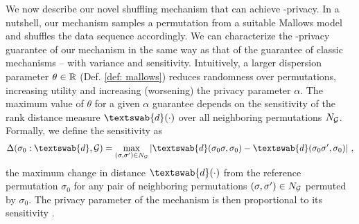 We now describe our novel shuffling mechanism that can achieve \name-privacy. In a nutshell, our mechanism samples a permutation from a suitable Mallows model and shuffles the data sequence accordingly. We can characterize the \name-privacy guarantee of our mechanism in the same way as that of the \DP guarantee of classic mechanisms \citep{Dwork} -- with variance and sensitivity. Intuitively, a larger dispersion parameter $\theta \in {\mathbb R}$ (Def. \ref{def: mallows}) reduces randomness over permutations, increasing utility and increasing (worsening) the privacy parameter $\alpha$. The maximum value of $\theta$ for a given $\alpha$ guarantee depends on the sensitivity of the rank distance measure $\textswab{d}(\cdot)$ over all neighboring permutations $N_{\mathcal{G}}$. Formally, we define the sensitivity as 
\begin{align*}
    \Delta(\sigma_0 : \textswab{d}, \calG) =
    \max_{(\sigma, \sigma') \in N_\calG} |\textswab{d}(\sigma_0 \sigma, \sigma_0) - \textswab{d}(\sigma_0 \sigma', \sigma_0)|~, 
\end{align*}
  the maximum change in distance $\textswab{d}(\cdot)$ from the reference permutation $\sigma_0$ for any pair of neighboring permutations $(\sigma,\sigma') \in N_{\mathcal{G}}$ permuted by $\sigma_0$. The privacy parameter of the mechanism is then proportional to its sensitivity . 
  
